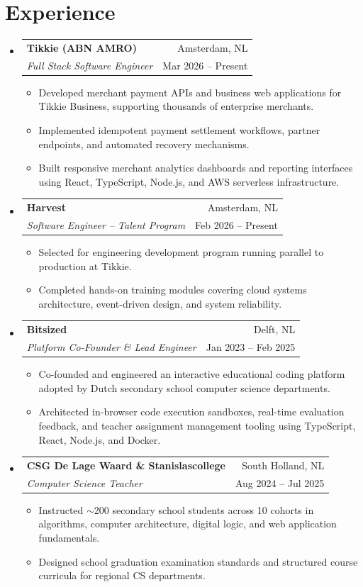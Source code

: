 \documentclass[10pt,a4paper]{article}
\makeatletter
\newcommand{\resumeSubheading}[4]{
  \vspace{1pt}
  \item[]
  \begin{tabular*}{\linewidth}{@{}l@{\extracolsep{\fill}}r@{}}
    \textbf{#1} & \footnotesize \color{subtle} #2 \\
    \textit{\small #3} & \footnotesize \color{subtle} #4 \\
  \end{tabular*}\vspace{-2pt}
}
\newcommand{\resumeItemListStart}{\begin{itemize}[leftmargin=1.1em, label=\textcolor{accent}{\scriptsize$\bullet$}, itemsep=1.5pt, topsep=1.5pt]}
\newcommand{\resumeItemListEnd}{\end{itemize}\vspace{-2pt}}
\makeatother
\begin{document}
\section{Experience}
\begin{itemize}[leftmargin=0em, label={}]

  \resumeSubheading
    {Tikkie (ABN AMRO)}{Amsterdam, NL}
    {Full Stack Software Engineer}{Mar 2026 -- Present}
    \resumeItemListStart
      \item Developed merchant payment APIs and business web applications for Tikkie Business, supporting thousands of enterprise merchants.
      \item Implemented idempotent payment settlement workflows, partner endpoints, and automated recovery mechanisms.
      \item Built responsive merchant analytics dashboards and reporting interfaces using React, TypeScript, Node.js, and AWS serverless infrastructure.
    \resumeItemListEnd

  \resumeSubheading
    {Harvest}{Amsterdam, NL}
    {Software Engineer -- Talent Program}{Feb 2026 -- Present}
    \resumeItemListStart
      \item Selected for engineering development program running parallel to production at Tikkie.
      \item Completed hands-on training modules covering cloud systems architecture, event-driven design, and system reliability.
    \resumeItemListEnd

  \resumeSubheading
    {Bitsized}{Delft, NL}
    {Platform Co-Founder \& Lead Engineer}{Jan 2023 -- Feb 2025}
    \resumeItemListStart
      \item Co-founded and engineered an interactive educational coding platform adopted by Dutch secondary school computer science departments.
      \item Architected in-browser code execution sandboxes, real-time evaluation feedback, and teacher assignment management tooling using TypeScript, React, Node.js, and Docker.
    \resumeItemListEnd

  \resumeSubheading
    {CSG De Lage Waard \& Stanislascollege}{South Holland, NL}
    {Computer Science Teacher}{Aug 2024 -- Jul 2025}
    \resumeItemListStart
      \item Instructed $\sim$200 secondary school students across 10 cohorts in algorithms, computer architecture, digital logic, and web application fundamentals.
      \item Designed school graduation examination standards and structured course curricula for regional CS departments.
    \resumeItemListEnd


\end{itemize}
\end{document}
